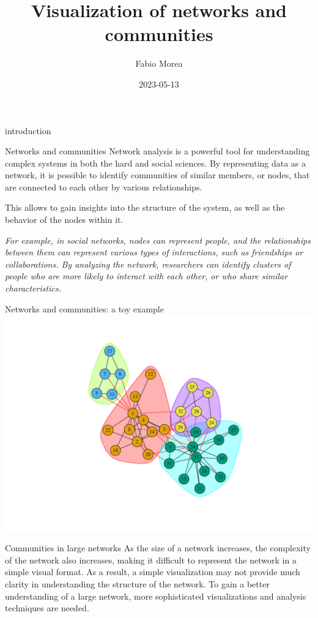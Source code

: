 \documentclass[
  ignorenonframetext,
]{beamer}
\title{Visualization of networks and communities}
\author{Fabio Morea}
\date{2023-05-13}
\begin{document}
\frame{\titlepage}

\begin{frame}{introduction}
\protect\hypertarget{introduction}{}
\begin{block}{Networks and communities}
\protect\hypertarget{networks-and-communities}{}
Network analysis is a powerful tool for understanding complex systems in
both the hard and social sciences. By representing data as a network, it
is possible to identify communities of similar members, or nodes, that
are connected to each other by various relationships.

This allows to gain insights into the structure of the system, as well
as the behavior of the nodes within it.

\emph{For example, in social networks, nodes can represent people, and
the relationships between them can represent various types of
interactions, such as friendships or collaborations. By analyzing the
network, researchers can identify clusters of people who are more likely
to interact with each other, or who share similar characteristics.}
\end{block}

\begin{block}{Networks and communities: a toy example}
\protect\hypertarget{networks-and-communities-a-toy-example}{}
\includegraphics{presentation1_files/figure-beamer/unnamed-chunk-2-1.pdf}
\end{block}

\begin{block}{Communities in large networks}
\protect\hypertarget{communities-in-large-networks}{}
As the size of a network increases, the complexity of the network also
increases, making it difficult to represent the network in a simple
visual format. As a result, a simple visualization may not provide much
clarity in understanding the structure of the network. To gain a better
understanding of a large network, more sophisticated visualizations and
analysis techniques are needed.
\end{block}


\end{frame}
\end{document}
